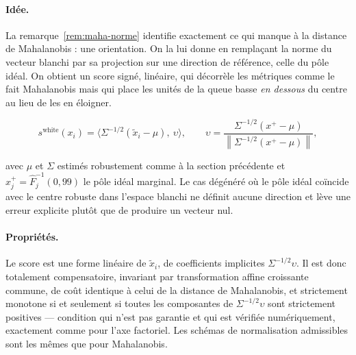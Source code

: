 \documentclass[11pt,a4paper]{article}
\theoremstyle{definition}
\theoremstyle{remark}
\newcommand{\norm}[1]{\left\lVert #1 \right\rVert}
\begin{document}
\paragraph{Idée.} La remarque~\ref{rem:maha-norme} identifie exactement ce qui manque à la
distance de Mahalanobis : une orientation. On la lui donne en remplaçant la norme du
vecteur blanchi par sa projection sur une direction de référence, celle du pôle idéal. On
obtient un score signé, linéaire, qui décorrèle les métriques comme le fait Mahalanobis
mais qui place les unités de la queue basse \emph{en dessous} du centre au lieu de les en
éloigner.

\medskip

\[
  s^{\mathrm{white}}(x_i)
  = \big\langle \Sigma^{-1/2}(\tilde{x}_i - \mu),\ \upsilon \big\rangle,
  \qquad
  \upsilon = \frac{\Sigma^{-1/2}(x^{+} - \mu)}{\norm{\Sigma^{-1/2}(x^{+} - \mu)}},
\]

\bigskip

avec $\mu$ et $\Sigma$ estimés robustement comme à la section précédente et
$x^{+}_j = \hat{F}_j^{-1}(0{,}99)$ le pôle idéal marginal. Le cas dégénéré où le pôle idéal
coïncide avec le centre robuste dans l'espace blanchi ne définit aucune direction et lève
une erreur explicite plutôt que de produire un vecteur nul.

\bigskip

\paragraph{Propriétés.} Le score est une forme linéaire de $\tilde{x}_i$, de coefficients
implicites $\Sigma^{-1/2}\upsilon$. Il est donc totalement compensatoire, invariant par
transformation affine croissante commune, de coût identique à celui de la distance de
Mahalanobis, et strictement monotone si et seulement si toutes les composantes de
$\Sigma^{-1/2}\upsilon$ sont strictement positives --- condition qui n'est pas garantie et
qui est vérifiée numériquement, exactement comme pour l'axe factoriel. Les schémas de
normalisation admissibles sont les mêmes que pour Mahalanobis.

\medskip
\end{document}
